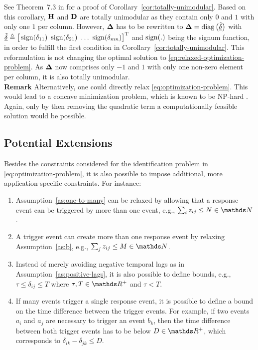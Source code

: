\documentclass[journal, 10pt]{IEEEtran}
\begin{document}
See Theorem~7.3 in \cite{Sierksma2001} for a proof of Corollary~\ref{cor:totally-unimodular}. Based on this corollary, ${{\mathbf{H}}}$ and ${{\mathbf{D}}}$ are totally unimodular as they contain only $0$ and $1$ with only one $1$ per column. However, ${{\mathbf{\Delta}}}$ has to be rewritten to
${{\mathbf{\Delta}}} = \operatorname{diag}\big({\underline{\tilde \delta}}\big)$ with $\vec{\tilde \delta} \DEF \big[\sign(\delta_{11})\ \sign(\delta_{21})\ \ldots\ \sign(\delta_{mn})\big]\T$ and $\operatorname{sign}(.)$ being the signum function, in order to fulfill the first condition in Corollary~\ref{cor:totally-unimodular}. This reformulation is not changing the optimal solution to \eqref{eq:relaxed-optimization-problem}. As ${{\mathbf{\Delta}}}$ now comprises only $-1$ and $1$ with only one non-zero element per column, it is also totally unimodular.
\\[1ex]
\noindent \textbf{Remark} Alternatively, one could directly relax \eqref{eq:optimization-problem}. This would lead to a concave minimization problem, which is known to be NP-hard \cite{Chinchuluun2005}. Again, only by then removing the quadratic term a computationally feasible solution would be possible.

\subsection{Potential Extensions}
\label{sec:lp_extensions}
%
Besides the constraints considered for the identification problem in \eqref{eq:optimization-problem}, it is also possible to impose additional, more application-specific constraints. For instance:

\begin{enumerate}
	\item Assumption~\ref{as:one-to-many} can be relaxed by allowing that a response event can be triggered by more than one event, e.g., $\textstyle\sum_i z_{ij} \le N \in \NewN$.
	\item A trigger event can create more than one response event by relaxing Assumption~\ref{as:b}, e.g., $\textstyle\sum_j z_{ij} \le M\in \NewN$.
	\item Instead of merely avoiding negative temporal lags as in Assumption~\ref{as:positive-lags}, it is also possible to define bounds, e.g., $\tau \le \delta_{ij} \le T$ where $\tau, T \in \NewR^+$ and $\tau < T$.
	\item If many events trigger a single response event, it is possible to define a bound on the time difference between the trigger events. For example, if two events $a_i$ and $a_j$ are necessary to trigger an event $b_k$, then the time difference between both trigger events has to be below $D \in \NewR^+$, which corresponds to $\delta_{ik}-\delta_{jk} \le D$.
\end{enumerate}
\end{document}
